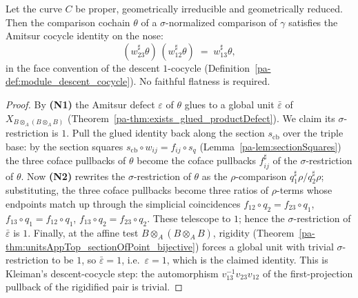 \begin{theorem}
  \label{pa-thm:normalizedComparison_coherent}
  \leanok

  Let the curve \(C\) be proper, geometrically irreducible and geometrically reduced. Then the
  comparison cochain \(\theta\) of a \(\sigma\)-normalized comparison of \(\gamma\) satisfies the
  Amitsur cocycle identity on the nose:
  \[
    (w_{23}^{\sharp}\theta)\,(w_{12}^{\sharp}\theta) \;=\; w_{13}^{\sharp}\theta ,
  \]
  in the face convention of the descent \(1\)-cocycle (Definition~\ref{pa-def:module_descent_cocycle}).
  No faithful flatness is required.
\end{theorem}
\begin{proof}
  \leanok
  By \textbf{(N1)} the Amitsur defect \(\varepsilon\) of \(\theta\) glues to a global unit
  \(\bar\varepsilon\) of \(X_{B \otimes_A (B \otimes_A B)}\)
  (Theorem~\ref{pa-thm:exists_glued_productDefect}). We claim its \(\sigma\)-restriction is \(1\).
  Pull the glued identity back along the section \(s_{\mathrm{cb}}\) over the triple base: by the
  section squares \(s_{\mathrm{cb}} \circ w_{ij} = f_{ij} \circ s_q\)
  (Lemma~\ref{pa-lem:sectionSquares}) the three coface pullbacks of \(\theta\) become the coface
  pullbacks \(f_{ij}^{\sharp}\) of the \(\sigma\)-restriction of \(\theta\). Now \textbf{(N2)}
  rewrites the \(\sigma\)-restriction of \(\theta\) as the \(\rho\)-comparison \(q_1^{\sharp}\rho /
  q_2^{\sharp}\rho\); substituting, the three coface pullbacks become three ratios of
  \(\rho\)-terms whose endpoints match up through the simplicial coincidences \(f_{12} \circ q_2 =
  f_{23} \circ q_1\), \(f_{13} \circ q_1 = f_{12} \circ q_1\), \(f_{13} \circ q_2 = f_{23} \circ
  q_2\). These telescope to \(1\); hence the \(\sigma\)-restriction of \(\bar\varepsilon\) is \(1\).
  Finally, at the affine test \(B \otimes_A (B \otimes_A B)\), rigidity
  (Theorem~\ref{pa-thm:unitsAppTop_sectionOfPoint_bijective}) forces a global unit with trivial
  \(\sigma\)-restriction to be \(1\), so \(\bar\varepsilon = 1\), i.e.\ \(\varepsilon = 1\), which is
  the claimed identity. This is Kleiman's descent-cocycle step: the automorphism
  \(v_{13}^{-1}v_{23}v_{12}\) of the first-projection pullback of the rigidified pair is trivial.
\end{proof}

